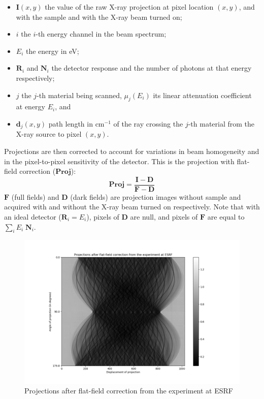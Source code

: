 \documentclass[11pt]{article}
\providecommand{\tightlist}{%
      \setlength{\itemsep}{0pt}\setlength{\parskip}{0pt}}
\begin{document}
\begin{itemize}
\tightlist
\item
  \(\mathbf{I}(x,y)\) the value of the raw X-ray projection at pixel
  location \((x,y)\), and with the sample and with the X-ray beam turned
  on;
\item
  \(i\) the \(i\)-th energy channel in the beam spectrum;\\
\item
  \(E_i\) the energy in eV;
\item
  \(\mathbf{R}_i\) and \(\mathbf{N}_i\) the detector response and the
  number of photons at that energy respectively;
\item
  \(j\) the \(j\)-th material being scanned, \(\mu_j(E_i)\) its linear
  attenuation coefficient at energy \(E_i\), and
\item
  \(\mathbf{d}_j(x,y)\) path length in cm\(^{-1}\) of the ray crossing
  the \(j\)-th material from the X-ray source to pixel \((x,y)\).
\end{itemize}

Projections are then corrected to account for variations in beam
homogeneity and in the pixel-to-pixel sensitivity of the detector. This
is the projection with flat-field correction (\(\mathbf{Proj}\)):
\[\mathbf{Proj} = \frac{\mathbf{I} - \mathbf{D}}{\mathbf{F} - \mathbf{D}}\]
\(\mathbf{F}\) (full fields) and \(\mathbf{D}\) (dark fields) are
projection images without sample and acquired with and without the X-ray
beam turned on respectively. Note that with an ideal detector
(\(\mathbf{R}_i=E_i\)), pixels of \(\mathbf{D}\) are null, and pixels of
\(\mathbf{F}\) are equal to \(\sum_i E_i \; \mathbf{N}_i\).

\begin{figure}
\centering
\includegraphics{plots/Normalised_projections_from_experiment_ESRF.png}
\caption{Projections after flat-field correction from the experiment at
ESRF}
\end{figure}
\end{document}
